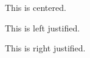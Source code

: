 \documentclass[12pt]{article}
\begin{document}
\begin{center}This is centered.\end{center}

\begin{flushleft}This is left justified.\end{flushleft}

\begin{flushright}This is right justified.\end{flushright}
\end{document}
